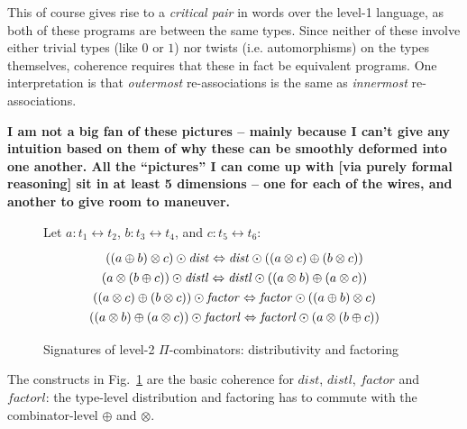 \documentclass{article}
\newcommand{\dist}{\mathit{dist}}
\newcommand{\factor}{\mathit{factor}}
\newcommand{\distl}{\mathit{distl}}
\newcommand{\factorl}{\mathit{factorl}}
\newcommand{\jc}[1]{\fbox{Jacques says:} \textbf{#1}}
\begin{document}
\noindent This of course gives rise to a \emph{critical pair} in words over the
level-1 language, as both of these programs are between the same types.
Since neither of these involve either trivial types (like $0$ or $1$) nor
twists (i.e. automorphisms) on the types themselves, coherence requires that
these in fact be equivalent programs.  One interpretation is that
\emph{outermost} re-associations is the same as \emph{innermost}
re-associations.

\jc{I am not a big fan of these pictures -- mainly because I can't give any
intuition based on them of why these can be smoothly deformed into one another.
All the ``pictures'' I can come up with [via purely formal reasoning] sit in at least
5 dimensions -- one for each of the wires, and another to give room to maneuver.}

\begin{figure}[tb]
Let $a : t_1 \leftrightarrow t_2$, $b : t_3 \leftrightarrow t_4$, and $c : t_5 \leftrightarrow t_6$:
\[\def\arraystretch{1.3}
\begin{array}{c}
  {((a \oplus b) \otimes c) \odot \dist \Leftrightarrow \dist \odot ((a \otimes c) \oplus (b \otimes c))}
\\
  {(a \otimes (b \oplus c)) \odot \distl \Leftrightarrow \distl \odot ((a \otimes b) \oplus (a \otimes c))}
\\
  {((a \otimes c) \oplus (b \otimes c)) \odot \factor \Leftrightarrow \factor \odot ((a \oplus b) \otimes c)}
\\
  {((a \otimes b) \oplus (a \otimes c)) \odot \factorl \Leftrightarrow \factorl \odot (a \otimes (b \oplus c))}
\end{array}\]
\caption{\label{figi}Signatures of level-2 $\Pi$-combinators: distributivity and factoring}
\end{figure}

The constructs in Fig.~\ref{figi} are the basic coherence for
$\dist$, $\distl$, $\factor$ and $\factorl$: the type-level distribution
and factoring has to commute with the combinator-level $\oplus$ and $\otimes$.
\end{document}
